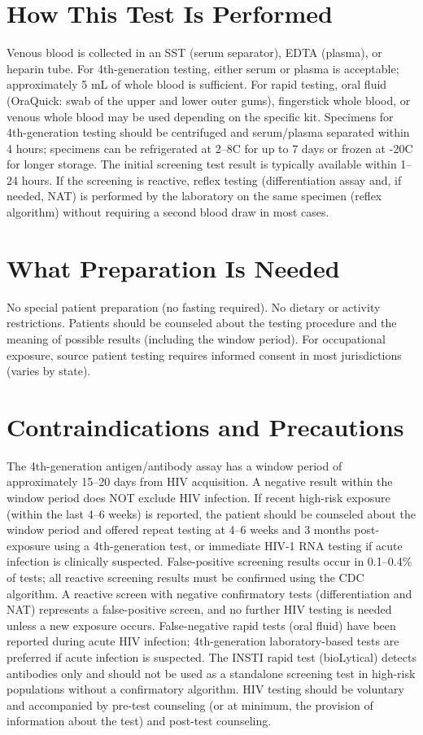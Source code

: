 \section*{How This Test Is Performed}
Venous blood is collected in an SST (serum separator), EDTA (plasma), or heparin tube. For 4th-generation testing, either serum or plasma is acceptable; approximately 5 mL of whole blood is sufficient. For rapid testing, oral fluid (OraQuick: swab of the upper and lower outer gums), fingerstick whole blood, or venous whole blood may be used depending on the specific kit. Specimens for 4th-generation testing should be centrifuged and serum/plasma separated within 4 hours; specimens can be refrigerated at 2--8\textdegree{}C for up to 7 days or frozen at -20\textdegree{}C for longer storage. The initial screening test result is typically available within 1--24 hours. If the screening is reactive, reflex testing (differentiation assay and, if needed, NAT) is performed by the laboratory on the same specimen (reflex algorithm) without requiring a second blood draw in most cases.

\section*{What Preparation Is Needed}
No special patient preparation (no fasting required). No dietary or activity restrictions. Patients should be counseled about the testing procedure and the meaning of possible results (including the window period). For occupational exposure, source patient testing requires informed consent in most jurisdictions (varies by state).

\section*{Contraindications and Precautions}
The 4th-generation antigen/antibody assay has a window period of approximately 15--20 days from HIV acquisition. A negative result within the window period does NOT exclude HIV infection. If recent high-risk exposure (within the last 4--6 weeks) is reported, the patient should be counseled about the window period and offered repeat testing at 4--6 weeks and 3 months post-exposure using a 4th-generation test, or immediate HIV-1 RNA testing if acute infection is clinically suspected. False-positive screening results occur in 0.1--0.4\% of tests; all reactive screening results must be confirmed using the CDC algorithm. A reactive screen with negative confirmatory tests (differentiation and NAT) represents a false-positive screen, and no further HIV testing is needed unless a new exposure occurs. False-negative rapid tests (oral fluid) have been reported during acute HIV infection; 4th-generation laboratory-based tests are preferred if acute infection is suspected. The INSTI rapid test (bioLytical) detects antibodies only and should not be used as a standalone screening test in high-risk populations without a confirmatory algorithm. HIV testing should be voluntary and accompanied by pre-test counseling (or at minimum, the provision of information about the test) and post-test counseling.

